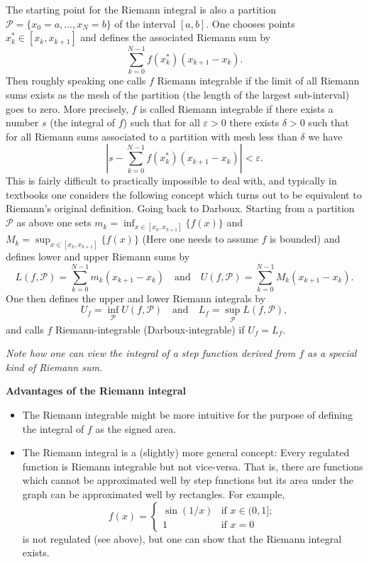 \documentclass[10pt, a4paper]{article}
\begin{document}
The starting point for the Riemann integral is also a partition $\mathcal{P} = \{x_0 = a, \dotsc, x_N = b\}$ of the interval $[a, b]$.
One chooses points $x_k ^ {*} \in [x_k, x_{k + 1}]$ and defines the associated Riemann sum by
\[
\sum_{k = 0}^{N - 1}f(x_k ^ {*})(x_{k + 1} - x_k).
\]
Then roughly speaking one calls $f$ Riemann integrable if the limit of all Riemann sums exists as the mesh of the partition
(the length of the largest sub-interval)
goes to zero.
More precisely,
$f$ is called Riemann integrable if there exists a number $s$
(the integral of $f$)
such that for all $\varepsilon > 0$ there exists $\delta > 0$ such that for all Riemann sums associated to a partition with mesh less than $\delta$ we have
\[
\left|s - \sum_{k = 0}^{N - 1}f(x_k ^ {*})(x_{k + 1} - x_k)\right| < \varepsilon.
\]
This is fairly difficult to practically impossible to deal with,
and typically in textbooks one considers the following concept which turns out to be equivalent to Riemann's original definition.
Going back to Darboux.
Starting from a partition $\mathcal{P}$ as above one sets $m_k = \inf_{x \in [x_k, x_{k + 1}]}\{f(x)\}$ and $M_k = \sup_{x \in [x_k, x_{k + 1}]}\{f(x)\}$
(Here one needs to assume $f$ is bounded)
and defines lower and upper Riemann sums by
\[
L(f, \mathcal{P}) = \sum_{k = 0}^{N - 1}m_k(x_{k + 1} - x_k)\quad\text{and}\quad U(f, \mathcal{P}) = \sum_{k = 0}^{N - 1}M_k(x_{k + 1} - x_k).
\]
One then defines the upper and lower Riemann integrals by
\[
U_f = \inf_{\mathcal{P}}U(f, \mathcal{P})\quad\text{and}\quad L_f = \sup_{\mathcal{P}}L(f, \mathcal{P}),
\]
and calls $f$ Riemann-integrable
(Darboux-integrable)
if $U_f = L_f$.

\textit{Note how one can view the integral of a step function derived from $f$ as a special kind of Riemann sum.}

\textbf{Advantages of the Riemann integral}
\begin{itemize}
    \item The Riemann integrable might be more intuitive for the purpose of defining the integral of $f$ as the signed area.
    
    \item The Riemann integral is a
    (slightly)
    more general concept:
    Every regulated function is Riemann integrable but not vice-versa.
    That is,
    there are functions which cannot be approximated well by step functions but its area under the graph can be approximated well by rectangles.
    For example,
    \[
    f(x) = \begin{cases}
        \sin(1 / x) &\text{if } x \in (0, 1]; \\
        1 &\text{if } x = 0
    \end{cases}
    \]
    is not regulated
    (see above),
    but one can show that the Riemann integral exists.
\end{itemize}
\end{document}
